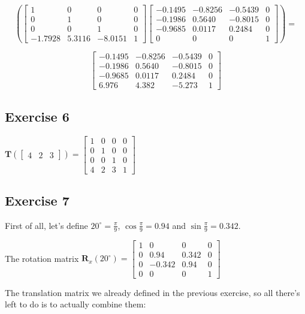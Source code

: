 \documentclass[11pt]{article}
\begin{document}
$$
\left(
\begin{bmatrix}
1 & 0 & 0 & 0 \\
0 & 1 & 0 & 0 \\
0 & 0 & 1 & 0 \\
-1.7928 & 5.3116 & -8.0151 & 1 
\end{bmatrix}
\begin{bmatrix}
-0.1495 & -0.8256 & -0.5439 & 0 \\
-0.1986 & 0.5640 & -0.8015 & 0 \\
-0.9685 & 0.0117 & 0.2484 & 0 \\
0 & 0 & 0 & 1
\end{bmatrix}
\right)=
$$

$$
\begin{bmatrix}
-0.1495 & -0.8256 & -0.5439 & 0 \\
-0.1986 & 0.5640 & -0.8015 & 0 \\
-0.9685 & 0.0117 & 0.2484 & 0 \\
6.976 & 4.382 & -5.273 & 1
\end{bmatrix}
$$

\subsection{Exercise 6}

$\textbf{T}(\begin{bmatrix}
4 & 2 & 3
\end{bmatrix})=
\begin{bmatrix}
1 & 0 & 0 & 0 \\
0 & 1 & 0 & 0 \\
0 & 0 & 1 & 0 \\
4 & 2 & 3 & 1
\end{bmatrix}
$

\subsection{Exercise 7}

First of all, let's define $20^\circ=\frac{\pi}{9}$, $\cos\frac{\pi}{9}=0.94$ and $\sin\frac{\pi}{9}=0.342$.

The rotation matrix $\textbf{R}_x(20^\circ)=
\begin{bmatrix}
1 & 0 & 0 & 0 \\
0 & 0.94 & 0.342 & 0 \\
0 & -0.342 & 0.94 & 0 \\
0 & 0 & 0 & 1
\end{bmatrix}
$

The translation matrix we already defined in the previous exercise, so all there's left to do is to actually combine them:
\end{document}

